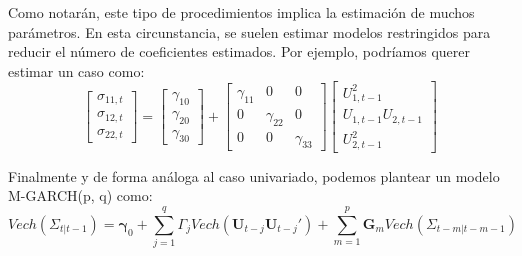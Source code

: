 \documentclass[
]{book}
\begin{document}
Como notarán, este tipo de procedimientos implica la estimación de muchos parámetros. En esta circunstancia, se suelen estimar modelos restringidos para reducir el número de coeficientes estimados. Por ejemplo, podríamos querer estimar un caso como:
\begin{equation*}
    \begin{bmatrix}
    \sigma_{11, t} \\ \sigma_{12, t} \\ \sigma_{22, t}
    \end{bmatrix} =
    \begin{bmatrix}
    \gamma_{10} \\ \gamma_{20} \\ \gamma_{30}
    \end{bmatrix} +
    \begin{bmatrix}
    \gamma_{11} & 0 & 0 \\ 0 & \gamma_{22} & 0 \\ 0 & 0 & \gamma_{33}
    \end{bmatrix} 
    \begin{bmatrix}
    U^2_{1, t-1} \\ U_{1, t-1} U_{2, t-1} \\ U^2_{2, t-1}
    \end{bmatrix}
\end{equation*}

Finalmente y de forma análoga al caso univariado, podemos plantear un modelo M-GARCH(p, q) como:
\begin{equation}
    Vech(\Sigma_{t | t-1}) = \boldsymbol{\gamma}_0 + \sum_{j = 1}^q \Gamma_j Vech(\mathbf{U}_{t-j} \mathbf{U}_{t-j}') + \sum_{m = 1}^p \mathbf{G}_m Vech(\Sigma_{t-m | t-m-1})
    \label{M_GARCH}
\end{equation}
\end{document}
